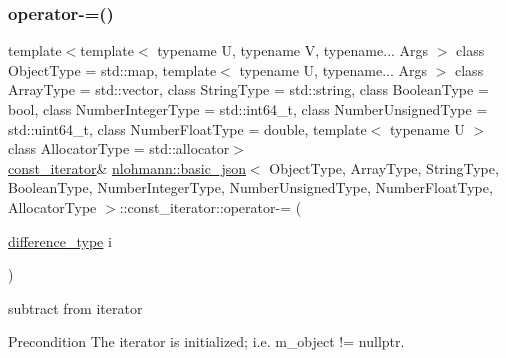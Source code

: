 \subsubsection{\texorpdfstring{operator-\/=()}{operator-=()}}
{\footnotesize\ttfamily template$<$template$<$ typename U, typename V, typename... Args $>$ class Object\+Type = std\+::map, template$<$ typename U, typename... Args $>$ class Array\+Type = std\+::vector, class String\+Type  = std\+::string, class Boolean\+Type  = bool, class Number\+Integer\+Type  = std\+::int64\+\_\+t, class Number\+Unsigned\+Type  = std\+::uint64\+\_\+t, class Number\+Float\+Type  = double, template$<$ typename U $>$ class Allocator\+Type = std\+::allocator$>$ \\
\hyperlink{classnlohmann_1_1basic__json_1_1const__iterator}{const\+\_\+iterator}\& \hyperlink{classnlohmann_1_1basic__json}{nlohmann\+::basic\+\_\+json}$<$ Object\+Type, Array\+Type, String\+Type, Boolean\+Type, Number\+Integer\+Type, Number\+Unsigned\+Type, Number\+Float\+Type, Allocator\+Type $>$\+::const\+\_\+iterator\+::operator-\/= (\begin{DoxyParamCaption}\item[{\hyperlink{classnlohmann_1_1basic__json_1_1const__iterator_a49d7c3e9ef3280df03052cce988b792f}{difference\+\_\+type}}]{i }\end{DoxyParamCaption})\hspace{0.3cm}{\ttfamily [inline]}}



subtract from iterator 

\begin{DoxyPrecond}{Precondition}
The iterator is initialized; i.\+e. {\ttfamily m\+\_\+object != nullptr}. 
\end{DoxyPrecond}
\hypertarget{classnlohmann_1_1basic__json_1_1const__iterator_abae808b09a822cc3da4cef0efb89115d}{}\label{classnlohmann_1_1basic__json_1_1const__iterator_abae808b09a822cc3da4cef0efb89115d} 

